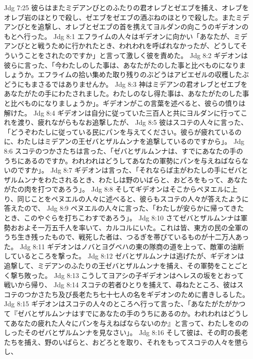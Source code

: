 Jdg 7:25  彼らはまたミデアンびとのふたりの君オレブとゼエブを捕え、オレブをオレブ岩のほとりで殺し、ゼエブをゼエブの酒ぶねのほとりで殺した。またミデアンびとを追撃し、オレブとゼエブの首を携えてヨルダンの向こうのギデオンのもとへ行った。
Jdg 8:1  エフライムの人々はギデオンに向かい「あなたが、ミデアンびとと戦うために行かれたとき、われわれを呼ばれなかったが、どうしてそういうことをされたのですか」と言って激しく彼を責めた。
Jdg 8:2  ギデオンは彼らに言った、「今わたしのした事は、あなたがたのした事と比べものになりましょうか。エフライムの拾い集めた取り残りのぶどうはアビエゼルの収穫したぶどうにもまさるではありませんか。
Jdg 8:3  神はミデアンの君オレブとゼエブをあなたがたの手にわたされました。わたしのなし得た事は、あなたがたのした事と比べものになりましょうか」。ギデオンがこの言葉を述べると、彼らの憤りは解けた。
Jdg 8:4  ギデオンは自分に従っていた三百人と共にヨルダンに行ってこれを渡り、疲れながらもなお追撃したが、
Jdg 8:5  彼はスコテの人々に言った、「どうぞわたしに従っている民にパンを与えてください。彼らが疲れているのに、わたしはミデアンの王ゼバとザルムンナを追撃しているのですから」。
Jdg 8:6  スコテのつかさたちは言った、「ゼバとザルムンナは、すでにあなたの手のうちにあるのですか。われわれはどうしてあなたの軍勢にパンを与えねばならないのですか」。
Jdg 8:7  ギデオンは言った、「それならば主がわたしの手にゼバとザルムンナをわたされるとき、わたしは野のいばらと、おどろをもって、あなたがたの肉を打つであろう」。
Jdg 8:8  そしてギデオンはそこからペヌエルに上り、同じことをペヌエルの人々に述べると、彼らもスコテの人々が答えたように答えたので、
Jdg 8:9  ペヌエルの人々に言った、「わたしが安らかに帰ってきたとき、このやぐらを打ちこわすであろう」。
Jdg 8:10  さてゼバとザルムンナは軍勢おおよそ一万五千人を率いて、カルコルにいた。これは皆、東方の民の全軍のうち生き残ったもので、戦死した者は、つるぎを帯びているものが十二万人あった。
Jdg 8:11  ギデオンはノバとヨグベハの東の隊商の道を上って、敵軍の油断しているところを撃った。
Jdg 8:12  ゼバとザルムンナは逃げたが、ギデオンは追撃して、ミデアンのふたりの王ゼバとザルムンナを捕え、その軍勢をことごとく撃ち敗った。
Jdg 8:13  こうしてヨアシの子ギデオンはヘレスの坂をとおって戦いから帰り、
Jdg 8:14  スコテの若者ひとりを捕えて、尋ねたところ、彼はスコテのつかさたち及び長老たち七十七人の名をギデオンのために書きしるした。
Jdg 8:15  ギデオンはスコテの人々のところへ行って言った、「あなたがたがかつて『ゼバとザルムンナはすでにあなたの手のうちにあるのか。われわれはどうしてあなたの疲れた人々にパンを与えねばならないのか』と言って、わたしをののしったそのゼバとザルムンナを見なさい」。
Jdg 8:16  そして彼は、その町の長老たちを捕え、野のいばらと、おどろとを取り、それをもってスコテの人々を懲らし、
